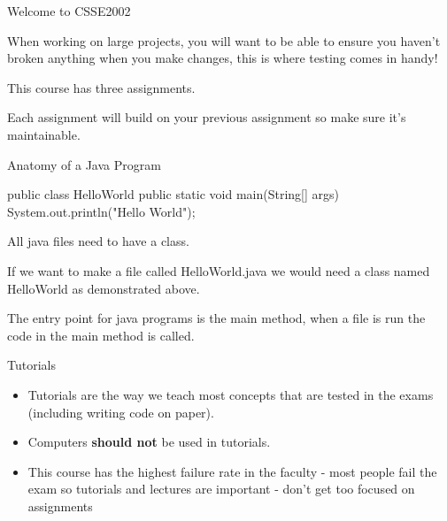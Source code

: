 \documentclass[week2]{csse2002}
\begin{document}
\begin{topic}{Welcome to CSSE2002}
\begin{subtopic}{6}
When working on large projects, you will want to be able to ensure you haven't broken anything when you make changes, this is where testing comes in handy!
\end{subtopic}

\begin{subtopic}{7}
This course has three assignments.

Each assignment will build on your previous assignment so make sure it's maintainable.
\end{subtopic}

\end{topic}

\begin{topic}{Anatomy of a Java Program}
\begin{java}
public class HelloWorld {
    public static void main(String[] args) {
        System.out.println("Hello World");
    }
}
\end{java}

All java files need to have a class.

If we want to make a file called HelloWorld.java we would need a class named HelloWorld as demonstrated above.

The entry point for java programs is the main method, when a file is run the code in the main method is called.
\end{topic}

\begin{topic}{Tutorials}
\begin{itemize}
\item Tutorials are the way we teach most concepts that are tested in the exams (including writing code on paper).

\item Computers \textbf{should not} be used in tutorials.

\item This course has the highest failure rate in the faculty - most people fail the exam so tutorials and lectures are important - don't get too focused on assignments
\end{itemize}
\end{topic}
\end{document}
